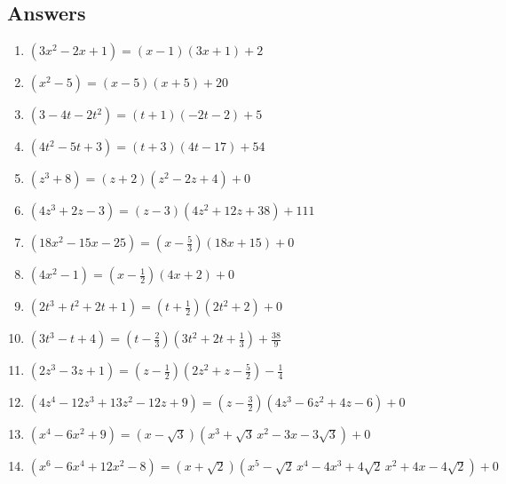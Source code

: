 \documentclass{ximera}
\begin{document}
	\author{Stitz-Zeager}

\subsection{Answers}


\begin{enumerate}

\item $\left(3x^2-2x+1 \right) = \left(x-1\right) (3x+1)+2$
\item $\left(x^2-5 \right)= \left(x-5\right)(x+5) + 20$


\item $\left(3-4t-2t^2 \right) = \left(t+1\right)(-2t-2)+5$
\item $\left(4t^2-5t +3\right) = \left(t+3\right)(4t-17)+54$


\item $\left(z^3 + 8 \right) = \left(z+2\right) \left(z^2-2z+4\right) + 0$
\item $\left(4z^3 +2z-3 \right) = \left(z -3\right) \left(4z^2+12z+38\right) + 111$


\item $\left(18x^2-15x-25\right) = \left(x - \frac{5}{3} \right)(18x+15)+0$
\item $\left(4x^2-1 \right) = \left(x - \frac{1}{2} \right)(4x+2)+0$


\item $\left(2t^3+t^2+2t+1 \right) = \left(t + \frac{1}{2} \right)\left(2t^2+2\right)+0$
\item $\left(3t^3 - t + 4 \right) = \left(t - \frac{2}{3} \right) \left(3t^2+2t+\frac{1}{3}\right) + \frac{38}{9}$


\item $\left(2z^3 - 3z +1 \right) = \left(z - \frac{1}{2} \right) \left(2z^2+z-\frac{5}{2}\right)-\frac{1}{4}$
\item $\left(4z^4-12z^3+13z^2 -12z+9\right) = \left(z - \frac{3}{2} \right) \left(4z^3-6z^2+4z-6 \right)+0$

\item $\left(x^4-6x^2+9 \right) = \left(x -\sqrt{3} \right) \left(x^3+\sqrt{3} \,x^2-3x-3\sqrt{3}\right) + 0$
\item $\left(x^6-6x^4+12x^2-8\right) = \left(x +\sqrt{2} \right) \left(x^5-\sqrt{2} \, x^4-4x^3+4\sqrt{2} \, x^2+4x-4\sqrt{2}\right) + 0$


\setcounter{HW}{\value{enumi}}
\end{enumerate}
\end{document}
